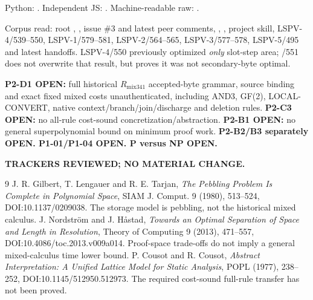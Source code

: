 \documentclass[11pt]{article}
\begin{document}
Python: .
Independent JS: .
Machine-readable raw: .

Corpus read: root , , issue \#3 and latest peer comments, , , project skill, LSPV-4/539--550, LSPV-1/579--581, LSPV-2/564--565, LSPV-3/577--578, LSPV-5/495 and latest handoffs. LSPV-4/550 previously optimized \emph{only} slot-step area; /551 does not overwrite that result, but proves it was not secondary-byte optimal.

\textbf{P2-D1 OPEN:} full historical $R_{\mathrm{mix341}}$ accepted-byte grammar, source binding and exact fixed mixed costs unauthenticated, including AND3, GF(2), LOCAL-CONVERT, native context/branch/join/discharge and deletion rules. \textbf{P2-C3 OPEN:} no all-rule cost-sound concretization/abstraction. \textbf{P2-B1 OPEN:} no general superpolynomial bound on minimum proof work. \textbf{P2-B2/B3 separately OPEN. P1-01/P1-04 OPEN. P versus NP OPEN.}

\textbf{TRACKERS REVIEWED; NO MATERIAL CHANGE.}
\begin{thebibliography}{9}
 J. R. Gilbert, T. Lengauer and R. E. Tarjan, \emph{The Pebbling Problem Is Complete in Polynomial Space}, SIAM J. Comput. 9 (1980), 513--524, DOI:10.1137/0209038. The storage model is pebbling, not the historical mixed calculus.
 J. Nordstr\"om and J. H\aa stad, \emph{Towards an Optimal Separation of Space and Length in Resolution}, Theory of Computing 9 (2013), 471--557, DOI:10.4086/toc.2013.v009a014. Proof-space trade-offs do not imply a general mixed-calculus time lower bound.
 P. Cousot and R. Cousot, \emph{Abstract Interpretation: A Unified Lattice Model for Static Analysis}, POPL (1977), 238--252, DOI:10.1145/512950.512973. The required cost-sound full-rule transfer has not been proved.
\end{thebibliography}
\end{document}
